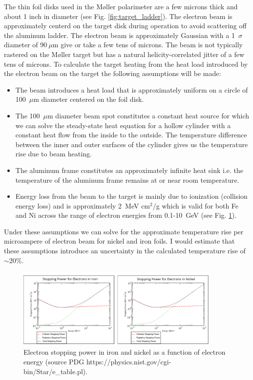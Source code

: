 \documentclass[12pt]{article}
\begin{document}
The thin foil disks used in the M\o ller polarimeter are a few microns thick and about 1 inch in diameter (see Fig. \ref{fig:target_ladder}). The electron beam is approximately centerd on the target disk during operation to avoid scattering off the aluminum ladder. The electron beam is approximately Gaussian with a 1~$\sigma$ diameter of 90$~\mu$m give or take a few tens of microns. The beam is not typically rastered on the M\o ller target but has a natural helicity-correlated jitter of a few tens of microns. To calculate the target heating from the heat load introduced by the electron beam on the target the following assumptions will be made:
\begin{itemize}
\item{The beam introduces a heat load that is approximately uniform on a circle of 100~$\mu$m diameter centered on the foil disk.}
\item{The 100~$\mu$m diameter beam spot constitutes a constant heat source for which we can solve the steady-state heat equation for a hollow cylinder with a constant heat flow from the inside to the outside. The temperature difference between the inner and outer surfaces of the cylinder gives us the temperature rise due to beam heating.}
\item{The aluminum frame constitutes an approximately infinite heat sink i.e. the temperature of the aluminum frame remains at or near room temperature.}
\item{Energy loss from the beam to the target is mainly due to ionization (collision energy loss) and is approximately 2~MeV cm$^2$/g which is valid for both Fe and Ni across the range of electron energies from 0.1-10~GeV (see Fig. \ref{fig:FeNi_stopping_power}).}
\end{itemize}
 Under these assumptions we can solve for the approximate temperature rise per microampere of electron beam for nickel and iron foils. I would estimate that these assumptions introduce an uncertainty in the calculated temperature rise of $\sim$20\%. 
\begin{figure}[h]
\centering
\includegraphics[width=0.9\textwidth]{FeNi_stopping_power.png}
\caption{Electron stopping power in iron and nickel as a function of electron energy (source PDG https://physics.nist.gov/cgi-bin/Star/e\_table.pl).}
\label{fig:FeNi_stopping_power}
\end{figure}
\end{document}
